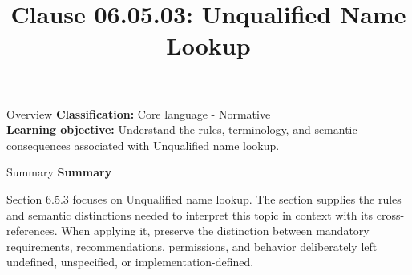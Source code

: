 \documentclass[10pt,letterpaper]{article}
\title{Clause 06.05.03: Unqualified Name Lookup}
\author{}
\date{}
\begin{document}
\maketitle
\begin{CornellOverviewBox}{Overview}
\textbf{Classification:} Core language - Normative\\[2pt]
\textbf{Learning objective:} Understand the rules, terminology, and semantic consequences associated with Unqualified name lookup.
\end{CornellOverviewBox}\begin{CornellSummaryBox}{Summary}
{\sffamily\bfseries\color{Accent} Summary}\par\vspace{3pt}Section 6.5.3 focuses on Unqualified name lookup. The section supplies the rules and semantic distinctions needed to interpret this topic in context with its cross-references. When applying it, preserve the distinction between mandatory requirements, recommendations, permissions, and behavior deliberately left undefined, unspecified, or implementation-defined.
\end{CornellSummaryBox}
\end{document}
